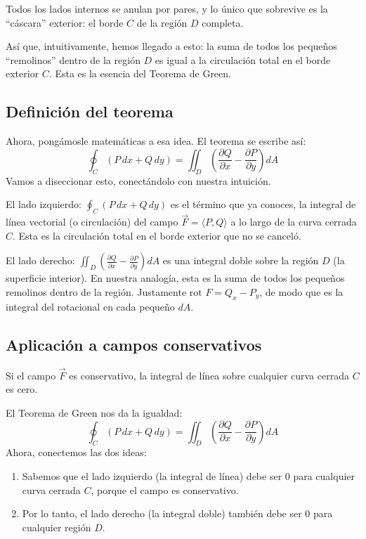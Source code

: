 Todos los lados internos se anulan por pares, y lo único que sobrevive es la ``cáscara'' exterior: el borde $C$ de la región $D$ completa.

Así que, intuitivamente, hemos llegado a esto: la suma de todos los pequeños ``remolinos'' dentro de la región $D$ es igual a la circulación total en el borde exterior $C$. Esta es la esencia del Teorema de Green.

\subsection{Definición del teorema}

Ahora, pongámosle matemáticas a esa idea. El teorema se escribe así:
$$\oint_C (P\,dx + Q\,dy) = \iint_D \left( \frac{\partial Q}{\partial x} - \frac{\partial P}{\partial y} \right) dA$$
Vamos a diseccionar esto, conectándolo con nuestra intuición. 

El lado izquierdo: $\oint_C (P\,dx + Q\,dy)$ es el término que ya conoces, la integral de línea vectorial (o circulación) del campo $\vec{F} = \langle P, Q \rangle$ a lo largo de la curva cerrada $C$. Esta es la circulación total en el borde exterior que no se canceló.

El lado derecho: $\iint_D \left( \frac{\partial Q}{\partial x} - \frac{\partial P}{\partial y} \right) dA$ es una integral doble sobre la región $D$ (la superficie interior). En nuestra analogía, esta es la suma de todos los pequeños remolinos dentro de la región. Justamente $\text{rot }F=Q_x-P_y$, de modo que es la integral del rotacional en cada pequeño $dA$.

\subsection{Aplicación a campos conservativos}

Si el campo $\vec{F}$ es conservativo, la integral de línea sobre cualquier curva cerrada $C$ es cero. 

El Teorema de Green nos da la igualdad:
$$\oint_C (P\,dx + Q\,dy) = \iint_D \left( \frac{\partial Q}{\partial x} - \frac{\partial P}{\partial y} \right) dA$$
Ahora, conectemos las dos ideas:
\begin{enumerate}
\item Sabemos que el lado izquierdo (la integral de línea) debe ser 0 para cualquier curva cerrada $C$, porque el campo es conservativo.
\item Por lo tanto, el lado derecho (la integral doble) también debe ser 0 para cualquier región $D$.
\end{enumerate}

